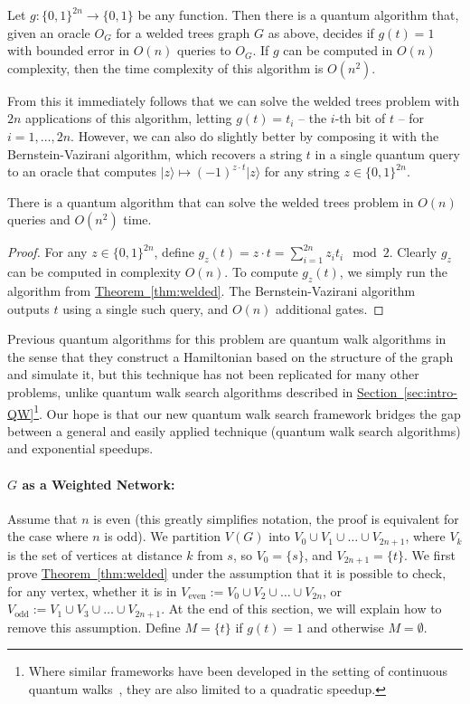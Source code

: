 \documentclass{theoretics}
\renewcommand{\sec}[1]{\hyperref[sec:#1]{Section~\ref*{sec:#1}}}
\newcommand{\thm}[1]{\hyperref[thm:#1]{Theorem~\ref*{thm:#1}}}
\def\ket#1{{\lvert}#1\rangle}
\renewcommand{\>}{\rangle}
\newcommand{\<}{\langle}
\renewcommand{\(}{\left(}
\renewcommand{\)}{\right)}
\begin{document}
\begin{theorem}\label{thm:welded}
Let $g:\{0,1\}^{2n}\rightarrow\{0,1\}$ be any function. Then there is a quantum algorithm that, given an oracle $O_G$ for a welded trees graph $G$ as above, decides if $g(t)=1$ with bounded error in $O(n)$ queries to $O_G$. If $g$ can be computed in $O(n)$ complexity, then the time complexity of this algorithm is ${O}(n^2)$. 
\end{theorem}


From this it immediately follows that we can solve the welded trees problem with $2n$ applications of this algorithm, letting $g(t)=t_i$ -- the $i$-th bit of $t$ -- for $i=1,\dots,2n$. However, we can also do slightly better by composing it with the Bernstein-Vazirani algorithm, which recovers a string $t$ in a single quantum query to an oracle that computes $\ket{z}\mapsto (-1)^{z\cdot t}\ket{z}$ for any string $z\in\{0,1\}^{2n}$.
\begin{corollary}
There is a quantum algorithm that can solve the welded trees problem in $O(n)$ queries and ${O}(n^2)$ time. 
\end{corollary}
\begin{proof}
For any $z\in\{0,1\}^{2n}$, define $g_z(t)=z\cdot t = \sum_{i=1}^{2n}z_it_i\mod 2$. Clearly $g_z$ can be computed in complexity $O(n)$. To compute $g_z(t)$, we simply run the algorithm from \thm{welded}. The Bernstein-Vazirani algorithm~\cite{bernstein1997BValg} outputs $t$ using a single such query, and $O(n)$ additional gates. 
\end{proof}

Previous quantum algorithms for this problem are quantum walk algorithms in the sense that they construct a Hamiltonian based on the structure of the graph and simulate it, but this technique has not been replicated for many other problems, unlike quantum walk search algorithms described in \sec{intro-QW}\footnote{Where similar frameworks have been developed in the setting of continuous quantum walks~\cite{apers2022quadratic}, they are also limited to a quadratic speedup.}. Our hope is that our new quantum walk search framework bridges the gap between a general and easily applied technique (quantum walk search algorithms) and exponential speedups. 



\paragraph{$G$ as a Weighted Network:} Assume that $n$ is even (this greatly simplifies notation, the proof is equivalent for the case where $n$ is odd). We partition $V(G)$ into $V_0\cup V_1\cup\dots\cup V_{2n+1}$, where $V_k$ is the set of vertices at distance $k$ from $s$, so $V_0=\{s\}$, and $V_{2n+1}=\{t\}$. We first prove \thm{welded} under the assumption that it is possible to check, for any vertex, whether it is in $V_{\mathrm{even}}:=V_0\cup V_2\cup\dots \cup V_{2n}$, or $V_{\mathrm{odd}}:=V_1\cup V_3\cup \dots\cup V_{2n+1}$. At the end of this section, we will explain how to remove this assumption. Define $M=\{t\}$ if $g(t)=1$ and otherwise $M=\emptyset$.
\end{document}
